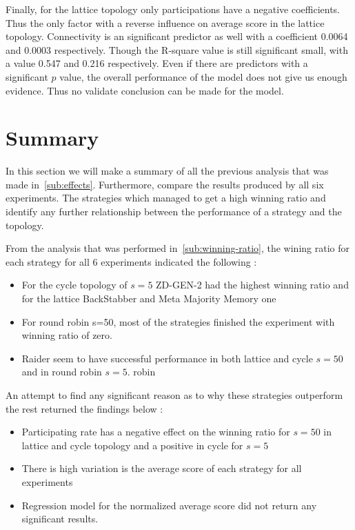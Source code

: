Finally, for the lattice topology only participations have a negative coefficients.
Thus the only factor with a reverse influence on average score in the lattice topology.
Connectivity is an significant predictor as well with a coefficient 0.0064 and
0.0003 respectively. Though the R-square value is still significant small,
with a value 0.547 and 0.216 respectively.
Even if there are predictors with a significant \(p\) value, the overall
performance of the model does not give us enough evidence. Thus no validate
conclusion can be made for the model.


\section{Summary}

In this section we will make a summary of all the previous analysis that was made
in~\ref{sub:effects}. Furthermore, compare the results produced by all
six experiments. The strategies which managed to get a high winning ratio and
identify any further relationship between the performance of a strategy and the
topology.

From the analysis that was performed in~\ref{sub:winning-ratio}, the wining ratio
for each strategy for all 6 experiments indicated the following :
\begin{itemize}
  \item For the cycle topology of \(s=5\) ZD-GEN-2 had the highest winning ratio
        and for the lattice BackStabber and Meta Majority Memory one
  \item For round robin s=50, most of the strategies finished the experiment
        with winning ratio of zero.
  \item Raider seem to have successful performance in both lattice and cycle \(s=50\)
        and in round robin \(s=5\).
        robin
\end{itemize}

An attempt to find any significant reason as to why these strategies outperform
the rest returned the findings below :
\begin{itemize}
  \item Participating rate has a negative effect on the winning ratio for \(s=50\)
        in lattice and cycle topology and a positive in cycle for \(s=5\)
  \item There is high variation is the average score of each strategy for all
        experiments
  \item Regression model for the normalized average score did not return any
        significant results.
\end{itemize}

